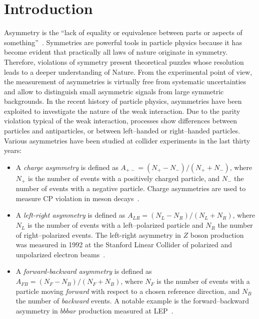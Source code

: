 \chapter{Introduction}
\label{sec:introduction}

Asymmetry is the ``lack of equality or equivalence between parts or
aspects of something''~\cite{oxforddict}.
Symmetries are powerful tools in particle physics because it has
become evident that practically all laws of nature originate in
symmetry. Therefore, violations of symmetry present theoretical
puzzles whose resolution leads to a deeper understanding of Nature. 
From the experimental point of view, the measurement of asymmetries is
virtually free from systematic uncertainties and allow to distinguish
small asymmetric signals from large symmetric backgrounds.
In the recent history of particle physics, asymmetries have been
exploited to investigate the nature of the weak interaction. 
Due to the parity violation typical of the weak
interaction, processes show differences between particles and
antiparticles, or between left--handed or right--handed particles.
Various asymmetries have been studied at collider experiments in the
last thirty years:

\begin{itemize}
\item A {\it charge asymmetry}  is defined as $A_{+-}=(N_+ -
  N_-)/(N_+ +N_-)$, where $N_+$ is the number of events with a
  positively charged particle, and $N_-$ the number of events with a
  negative particle. Charge asymmetries are used to measure CP
  violation in meson decays~\cite{LHCb:2012fb}.
\item A {\it left-right asymmetry} is defined as $A_{LR}=(N_L -
  N_R)/(N_L +N_R)$, where $N_L$ is the number of events with a
  left--polarized particle and $N_R$ the number of right--polarized
  events. The left-right asymmetry in $Z$ boson production was
  measured in 1992 at the Stanford Linear Collider of polarized and
  unpolarized electron beams~\cite{Elia:1993ka}.
\item A {\it forward-backward asymmetry} is defined as $A_{FB}=(N_F -
  N_B)/(N_F +N_B)$, where $N_F$ is the number of events with a
  particle moving {\it forward} with respect to a chosen reference
  direction, and $N_B$ the number of {\it backward} events. A notable
  example is the forward--backward asymmetry in $bbbar$ production
  measured at LEP~\cite{ALEPH:2005ab}.
\end{itemize}

